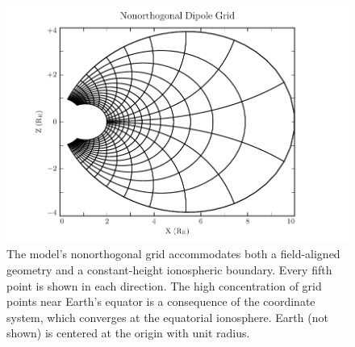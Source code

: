 \documentclass{article}
\begin{document}






\begin{figure}
    \begin{center}
    \includegraphics[width=\textwidth]{figures/fig_grid.pdf}
    \caption{
        The model's nonorthogonal grid accommodates both a field-aligned geometry and a constant-height ionospheric boundary. Every fifth point is shown in each direction. The high concentration of grid points near Earth's equator is a consequence of the coordinate system, which converges at the equatorial ionosphere. Earth (not shown) is centered at the origin with unit radius.
    }
    \label{fig_grid}
    \end{center}
\end{figure}

\end{document}
